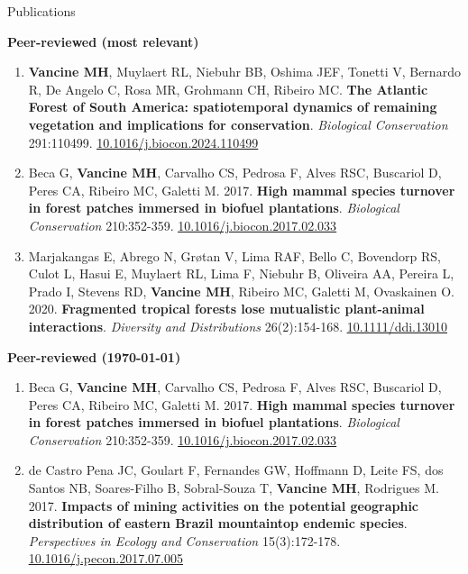 \documentclass{resume}
\begin{document}
\begin{rSection}{Publications}

{\bf Peer-reviewed (most relevant)}

\begin{enumerate} 

\item {\bf Vancine MH}, Muylaert RL, Niebuhr BB, Oshima JEF, Tonetti V, Bernardo R, De Angelo C, Rosa MR, Grohmann CH, Ribeiro MC. {\bf The Atlantic Forest of South America: spatiotemporal dynamics of remaining vegetation and implications for conservation}. {\it Biological Conservation} 291:110499. \href{https://doi.org/10.1016/j.biocon.2024.110499}{\underline{10.1016/j.biocon.2024.110499}}

\item Beca G, {\bf Vancine MH}, Carvalho CS, Pedrosa F, Alves RSC, Buscariol D, Peres CA, Ribeiro MC, Galetti M. 2017. {\bf High mammal species turnover in forest patches immersed in biofuel plantations}. {\it Biological Conservation} 210:352-359. \href{https://doi.org/10.1016/j.biocon.2017.02.033}{\underline{10.1016/j.biocon.2017.02.033}}

\item Marjakangas E, Abrego N, Grøtan V, Lima RAF, Bello C, Bovendorp RS, Culot L, Hasui E, Muylaert RL, Lima F, Niebuhr B, Oliveira AA, Pereira L, Prado I, Stevens RD, {\bf Vancine MH}, Ribeiro MC, Galetti M, Ovaskainen O. 2020. {\bf Fragmented tropical forests lose mutualistic plant-animal interactions}. {\it Diversity and Distributions} 26(2):154-168. \href{https://doi.org/10.1111/ddi.13010}{\underline{10.1111/ddi.13010}}

\end{enumerate} 

{\bf Peer-reviewed (\today)}

\begin{enumerate} 
\item Beca G, {\bf Vancine MH}, Carvalho CS, Pedrosa F, Alves RSC, Buscariol D, Peres CA, Ribeiro MC, Galetti M. 2017. {\bf High mammal species turnover in forest patches immersed in biofuel plantations}. {\it Biological Conservation} 210:352-359. \href{https://doi.org/10.1016/j.biocon.2017.02.033}{\underline{10.1016/j.biocon.2017.02.033}}

\item de Castro Pena JC, Goulart F, Fernandes GW, Hoffmann D, Leite FS, dos Santos NB, Soares-Filho B, Sobral-Souza T, {\bf Vancine MH}, Rodrigues M. 2017. {\bf Impacts of mining activities on the potential geographic distribution of eastern Brazil mountaintop endemic species}. {\it Perspectives in Ecology and Conservation} 15(3):172-178. \href{https://doi.org/10.1016/j.pecon.2017.07.005}{\underline{10.1016/j.pecon.2017.07.005}}


\end{enumerate}
\end{rSection}
\end{document}
